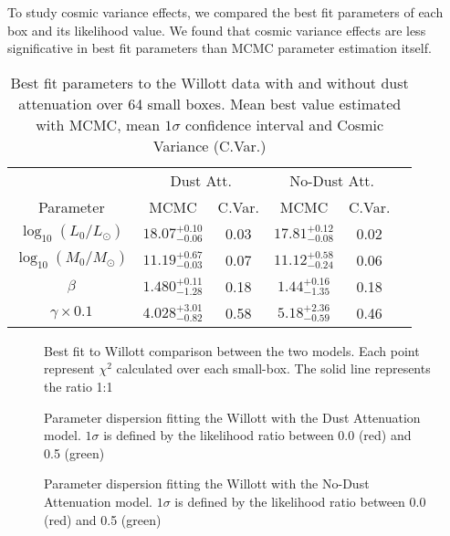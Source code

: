 \documentclass{emulateapj}
\begin{document}
To study cosmic variance effects, we compared the best fit parameters
of each box and its likelihood value. We found that cosmic variance
effects are less significative in best fit parameters than MCMC parameter
estimation itself. 

\begin{table}
\begin{center}
\begin{tabular}{cccccc}\hline\hline
 & \multicolumn{2}{c}{Dust Att.} & \multicolumn{2}{c}{No-Dust Att.}\\
Parameter                  & MCMC                  & C.Var. & MCMC                    & C.Var. \\\hline
$\log_{10}(L_0/L_{\odot})$ & $18.07_{-0.06}^{+0.10}$ & 0.03 & $17.81_{-0.08}^{+0.12}$ & 0.02  \\
$\log_{10}(M_0/M_{\odot})$ & $11.19_{-0.03}^{+0.67}$ & 0.07 & $11.12_{-0.24}^{+0.58}$ & 0.06  \\
$\beta$                    & $1.480_{-1.28}^{+0.11}$ & 0.18 & $ 1.44_{-1.35}^{+0.16}$ & 0.18  \\
$\gamma\times0.1$          & $4.028_{-0.82}^{+3.01}$ & 0.58 & $ 5.18_{-0.59}^{+2.36}$ & 0.46  \\
\hline\hline
\end{tabular}
\caption{ Best fit parameters to the Willott data with and without 
dust attenuation over 64 small boxes. Mean best value estimated 
with MCMC, mean $1\sigma$ confidence interval and Cosmic Variance
(C.Var.)
} 
\label{table:Willott_best_fit_parameters_no_dust}
\end{center}
\end{table}


\begin{figure}
\caption{Best fit to Willott comparison between the two models. Each point represent $\chi^2$ 
calculated over each small-box. The solid line represents the ratio 1:1 }
\label{fig:OD1_chi2_comparison}
\end{figure}

\begin{figure}
\caption{Parameter dispersion fitting the Willott with the Dust Attenuation model. 
$1\sigma$ is defined by the likelihood ratio between 0.0 (red) and 0.5 (green)}
\label{fig:OD1_MCMC_best_steps_w}
\end{figure}

\begin{figure}
\caption{Parameter dispersion fitting the Willott with the No-Dust Attenuation model. 
$1\sigma$ is defined by the likelihood ratio between 0.0 (red) and 0.5 (green)}
\label{fig:OD1_MCMC_best_steps_wo}
\end{figure}
\end{document}
